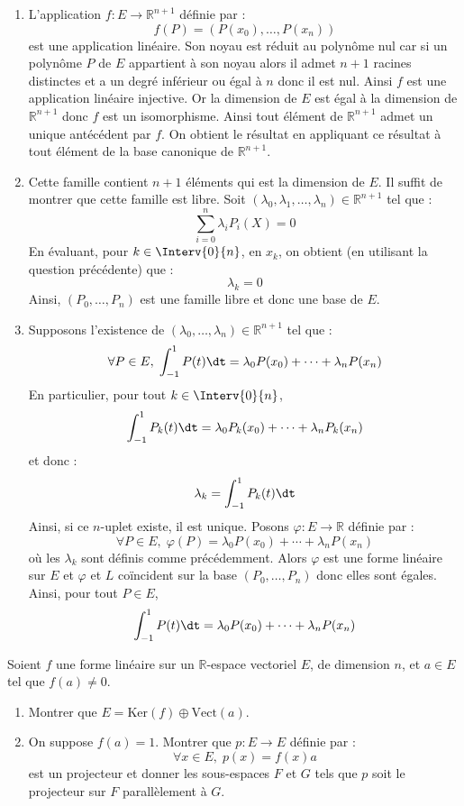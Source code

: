 \documentclass[a4paper,10pt]{report}
\begin{document}
\begin{enumerate}
\item L'application $f : E \rightarrow \mathbb{R}^{n+1}$ définie par :
$$ f(P) = (P(x_0), \ldots, P(x_n))$$
est une application linéaire. Son noyau est réduit au polynôme nul car si un polynôme $P$ de $E$ appartient à son noyau alors il admet $n+1$ racines distinctes et a un degré inférieur ou égal à $n$ donc il est nul. Ainsi $f$ est une application linéaire injective. Or la dimension de $E$ est égal à la dimension de $\mathbb{R}^{n+1}$ donc $f$ est un isomorphisme. Ainsi tout élément de $\mathbb{R}^{n+1}$ admet un unique antécédent par $f$. On obtient le résultat en appliquant ce résultat à tout élément de la base canonique de $\mathbb{R}^{n+1}$.
\item Cette famille contient $n+1$ éléments qui est la dimension de $E$. Il suffit de montrer que cette famille est libre. Soit $(\lambda_0, \lambda_1, \ldots, \lambda_n) \in \mathbb{R}^{n+1}$ tel que :
$$ \sum_{i=0}^n \lambda_i P_i (X)= 0$$
En évaluant, pour $k \in \Interv{0}{n}$, en $x_k$, on obtient (en utilisant la question précédente) que :
$$ \lambda_k =0$$
Ainsi, $(P_0, \ldots, P_n)$ est une famille libre et donc une base de $E$.
\item Supposons l'existence de $(\lambda_0, \ldots, \lambda_n) \in \mathbb{R}^{n+1}$ tel que :
$$ \forall P \in E, \; \int_{-1}^1 P(t) \dt = \lambda_0 P(x_0) + \cdots + \lambda_n P(x_n)$$
En particulier, pour tout $k \in \Interv{0}{n}$,
$$ \int_{-1}^1 P_k(t) \dt = \lambda_0 P_k(x_0) + \cdots + \lambda_n P_k(x_n)$$
et donc :
$$ \lambda_k =  \int_{-1}^1 P_k(t) \dt$$
Ainsi, si ce $n$-uplet existe, il est unique. Posons $\varphi : E \rightarrow \mathbb{R}$ définie par :
$$  \forall P \in E, \;  \varphi(P)= \lambda_0 P(x_0) + \cdots + \lambda_n P(x_n)$$
où les $\lambda_k$ sont définis comme précédemment. Alors $\varphi$ est une forme linéaire sur $E$ et $\varphi$ et $L$ coïncident sur la base $(P_0, \ldots, P_n)$ donc elles sont égales. Ainsi, pour tout $P \in E$,
$$ \int_{-1}^1 P(t) \dt = \lambda_0 P(x_0) + \cdots + \lambda_n P(x_n)$$
\end{enumerate}

\medskip

\begin{Exercice}{} Soient $f$ une forme linéaire sur un $\mathbb{R}$-espace vectoriel $E$, de dimension $n$, et $a\in E$ tel que $f(a)\neq 0$.
\begin{enumerate}
\item Montrer que $E=\textrm{Ker}(f)\oplus\textrm{Vect}(a)$.
\item On suppose $f(a)=1$. Montrer que $p : E \rightarrow E$ définie par :
$$ \forall x \in E, \; p(x) = f(x) a $$
est un projecteur et donner les sous-espaces $F$ et $G$ tels que $p$ soit le projecteur sur $F$ parallèlement à $G$.
\end{enumerate}
\end{Exercice}
\end{document}

